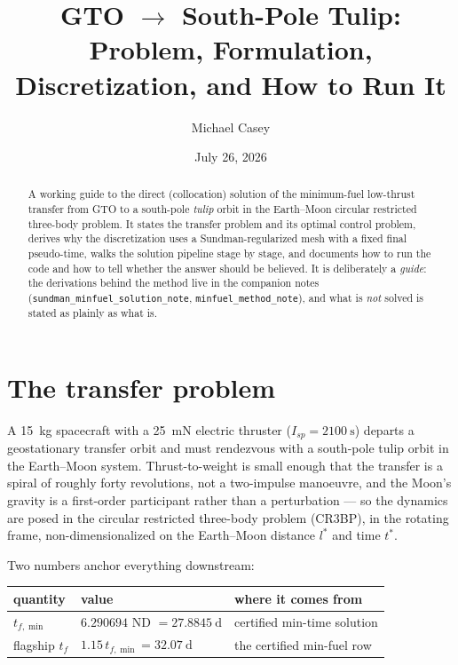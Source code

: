 \documentclass[11pt]{article}
\title{GTO $\to$ South-Pole Tulip: \\
Problem, Formulation, Discretization, and How to Run It}
\author{Michael Casey}
\date{July 26, 2026}
\newcommand{\file}[1]{\texttt{#1}}
\begin{document}
\maketitle

\begin{abstract}
A working guide to the direct (collocation) solution of the minimum-fuel
low-thrust transfer from GTO to a south-pole \emph{tulip} orbit in the
Earth--Moon circular restricted three-body problem. It states the transfer
problem and its optimal control problem, derives why the discretization uses a
Sundman-regularized mesh with a fixed final pseudo-time, walks the solution
pipeline stage by stage, and documents how to run the code and how to tell
whether the answer should be believed. It is deliberately a \emph{guide}: the
derivations behind the method live in the companion notes
(\file{sundman\_minfuel\_solution\_note}, \file{minfuel\_method\_note}), and
what is \emph{not} solved is stated as plainly as what is.
\end{abstract}

\tableofcontents

\section{The transfer problem}

A \SI{15}{\kilo\gram} spacecraft with a \SI{25}{\milli\newton} electric
thruster ($I_{sp}=\SI{2100}{\second}$) departs a geostationary transfer orbit
and must rendezvous with a south-pole tulip orbit in the Earth--Moon system.
Thrust-to-weight is small enough that the transfer is a spiral of roughly forty
revolutions, not a two-impulse manoeuvre, and the Moon's gravity is a
first-order participant rather than a perturbation --- so the dynamics are
posed in the circular restricted three-body problem (CR3BP), in the rotating
frame, non-dimensionalized on the Earth--Moon distance $l^\ast$ and time
$t^\ast$.

Two numbers anchor everything downstream:

\begin{center}
\begin{tabular}{lll}
\toprule
quantity & value & where it comes from \\
\midrule
$t_{f,\min}$ & $6.290694$ ND $=\SI{27.8845}{\day}$ & certified min-time solution \\
flagship $t_f$ & $1.15\,t_{f,\min}=\SI{32.07}{\day}$ & the certified min-fuel row \\
\bottomrule
\end{tabular}
\end{center}
\end{document}
